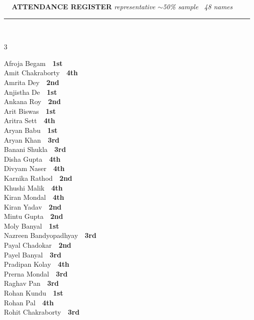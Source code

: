 \documentclass[11pt,a4paper]{article}
\begin{document}
\vspace{3pt}\noindent
{\footnotesize\bfseries\color{Slate}\faListOl~~ATTENDANCE REGISTER}%
\hfill{\scriptsize\itshape\color{Slate}representative $\sim$50\% sample \textperiodcentered\ 48 names}\\[3pt]
{\color{Line}\rule{\linewidth}{0.5pt}}\\[5pt]
\begingroup\footnotesize\setlength{\columnsep}{20pt}\setlength{\parskip}{1pt}%
\begin{multicols}{3}\raggedright
Afroja Begam~\dotfill~\textbf{1st}\\
Amit Chakraborty~\dotfill~\textbf{4th}\\
Amrita Dey~\dotfill~\textbf{2nd}\\
Anjistha De~\dotfill~\textbf{1st}\\
Ankana Roy~\dotfill~\textbf{2nd}\\
Arit Biswas~\dotfill~\textbf{1st}\\
Aritra Sett~\dotfill~\textbf{4th}\\
Aryan Babu~\dotfill~\textbf{1st}\\
Aryan Khan~\dotfill~\textbf{3rd}\\
Banani Shukla~\dotfill~\textbf{3rd}\\
Disha Gupta~\dotfill~\textbf{4th}\\
Divyam Naser~\dotfill~\textbf{4th}\\
Karnika Rathod~\dotfill~\textbf{2nd}\\
Khushi Malik~\dotfill~\textbf{4th}\\
Kiran Mondal~\dotfill~\textbf{4th}\\
Kiran Yadav~\dotfill~\textbf{2nd}\\
Mintu Gupta~\dotfill~\textbf{2nd}\\
Moly Banyal~\dotfill~\textbf{1st}\\
Nazreen Bandyopadhyay~\dotfill~\textbf{3rd}\\
Payal Chadokar~\dotfill~\textbf{2nd}\\
Payel Banyal~\dotfill~\textbf{3rd}\\
Pradipan Kolay~\dotfill~\textbf{4th}\\
Prerna Mondal~\dotfill~\textbf{3rd}\\
Raghav Pan~\dotfill~\textbf{3rd}\\
Rohan Kundu~\dotfill~\textbf{1st}\\
Rohan Pal~\dotfill~\textbf{4th}\\
Rohit Chakraborty~\dotfill~\textbf{3rd}\\

\end{multicols}
\end{document}
